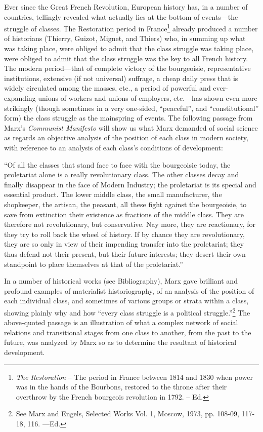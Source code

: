\documentclass[a4paper,12pt]{book}
\begin{document}
Ever since the Great French Revolution, European history has, in a number of countries, tellingly revealed what actually lies at the bottom of events—the struggle of classes. The Restoration period in France\footnote{\emph{The Restoration} -- The period in France between 1814 and 1830 when power was in the hands of the Bourbons, restored to the throne after their overthrow by the French bourgeois revolution in 1792. -- Ed.} already produced a number of historians (Thierry, Guizot, Mignet, and Thiers) who, in summing up what was taking place, were obliged to admit that the class struggle was taking place, were obliged to admit that the class struggle was the key to all French history. The modern period—that of complete victory of the bourgeoisie, representative institutions, extensive (if not universal) suffrage, a cheap daily press that is widely circulated among the masses, etc., a period of powerful and ever-expanding unions of workers and unions of employers, etc.—has shown even more strikingly (though sometimes in a very one-sided, “peaceful”, and “constitutional” form) the class struggle as the mainspring of events. The following passage from Marx’s \emph{Communist Manifesto} will show us what Marx demanded of social science as regards an objective analysis of the position of each class in modern society, with reference to an analysis of each class’s conditions of development:

\begin{center}
  \footnotesize{“Of all the classes that stand face to face with the bourgeoisie today, the proletariat alone is a really revolutionary class. The other classes decay and finally disappear in the face of Modern Industry; the proletariat is its special and essential product. The lower middle class, the small manufacturer, the shopkeeper, the artisan, the peasant, all these fight against the bourgeoisie, to save from extinction their existence as fractions of the middle class. They are therefore not revolutionary, but conservative. Nay more, they are reactionary, for they try to roll back the wheel of history. If by chance they are revolutionary, they are so only in view of their impending transfer into the proletariat; they thus defend not their present, but their future interests; they desert their own standpoint to place themselves at that of the proletariat.”}
\end{center}

 In a number of historical works (see Bibliography), Marx gave brilliant and profound examples of materialist historiography, of an analysis of the position of each individual class, and sometimes of various groups or strata within a class, showing plainly why and how “every class struggle is a political struggle.”\footnote{See Marx and Engels, Selected Works Vol. 1, Moscow, 1973, pp. 108-09, 117-18, 116. —Ed.} The above-quoted passage is an illustration of what a complex network of social relations and transitional stages from one class to another, from the past to the future, was analyzed by Marx so as to determine the resultant of historical development.
\end{document}
